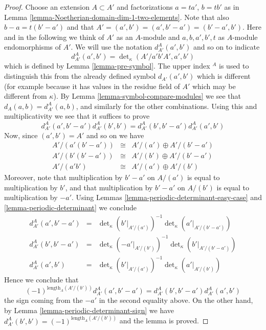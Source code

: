 \documentclass[10pt,a4paper]{amsart}
\theoremstyle{plain}
\theoremstyle{definition}
\theoremstyle{remark}
\numberwithin{equation}{subsection}
\begin{document}
\begin{proof}
\medskip\noindent
Choose an extension $A \subset A'$ and factorizations
$a = ta'$, $b = tb'$ as in
Lemma \ref{lemma-Noetherian-domain-dim-1-two-elements}.
Note that also $b - a = t(b' - a')$ and that
$A' = (a', b') = (a', b' - a') = (b' - a', b')$.
Here and in the following we think of $A'$ as an $A$-module and
$a, b, a', b', t$ as $A$-module endomorphisms of $A'$.
We will use the notation $d^A_{A'}(a', b')$ and so on to indicate
$$
d^A_{A'}(a', b')
=
\det\nolimits_\kappa(A'/a'b'A', a', b')
$$
which is defined by Lemma \ref{lemma-pre-symbol}. The upper index ${}^A$
is used to distinguish this from the already defined symbol
$d_{A'}(a', b')$ which is different (for example because it has values
in the residue field of $A'$ which may be different from $\kappa$).
By Lemma \ref{lemma-symbol-compare-modules} we see that
$d_A(a, b) = d^A_{A'}(a, b)$,
and similarly for the other combinations.
Using this and multiplicativity we see that it suffices to prove
$$
d^A_{A'}(a', b' - a') d^A_{A'}(b', b')
=
d^A_{A'}(b', b' - a') d^A_{A'}(a', b')
$$
Now, since $(a', b') = A'$ and so on we have
$$
\begin{matrix}
A'/(a'(b' - a')) & \cong & A'/(a') \oplus A'/(b' - a') \\
A'/(b'(b' - a')) & \cong & A'/(b') \oplus A'/(b' - a') \\
A'/(a'b') & \cong & A'/(a') \oplus A'/(b')
\end{matrix}
$$
Moreover, note that multiplication by $b' - a'$ on
$A/(a')$ is equal to multiplication by $b'$, and that
multiplication by $b' - a'$ on $A/(b')$ is equal to multiplication by $-a'$.
Using Lemmas
\ref{lemma-periodic-determinant-easy-case} and
\ref{lemma-periodic-determinant}
we conclude
$$
\begin{matrix}
d^A_{A'}(a', b' - a') & = &
\det\nolimits_\kappa(b'|_{A'/(a')})^{-1}
\det\nolimits_\kappa(a'|_{A'/(b' - a')}) \\
d^A_{A'}(b', b' - a') & = &
\det\nolimits_\kappa(-a'|_{A'/(b')})^{-1}
\det\nolimits_\kappa(b'|_{A'/(b' - a')}) \\
d^A_{A'}(a', b') & = &
\det\nolimits_\kappa(b'|_{A'/(a')})^{-1}
\det\nolimits_\kappa(a'|_{A'/(b')})
\end{matrix}
$$
Hence we conclude that
$$
(-1)^{\text{length}_A(A'/(b'))}
d^A_{A'}(a', b' - a')
=
d^A_{A'}(b', b' - a') d^A_{A'}(a', b')
$$
the sign coming from the $-a'$ in the second equality above.
On the other hand, by Lemma \ref{lemma-periodic-determinant-sign} we have
$d^A_{A'}(b', b') = (-1)^{\text{length}_A(A'/(b'))}$ and the lemma
is proved.
\end{proof}
\end{document}
